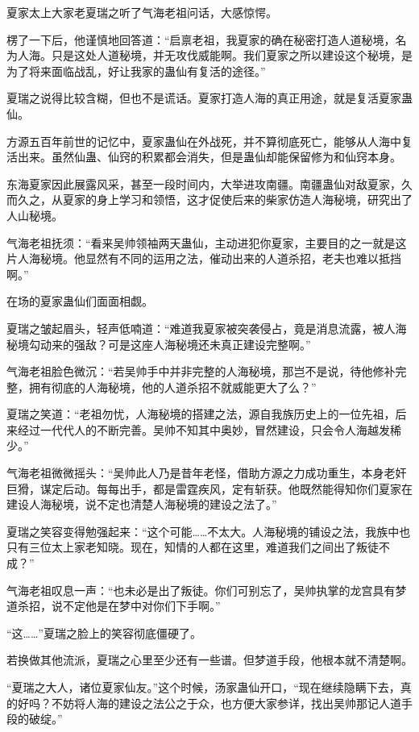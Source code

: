 
\begin{this_body}

夏家太上大家老夏瑞之听了气海老祖问话，大感惊愕。

楞了一下后，他谨慎地回答道：“启禀老祖，我夏家的确在秘密打造人道秘境，名为人海。只是这处人道秘境，并无攻伐威能啊。我们夏家之所以建设这个秘境，是为了将来面临战乱，好让我家的蛊仙有复活的途径。”

夏瑞之说得比较含糊，但也不是谎话。夏家打造人海的真正用途，就是复活夏家蛊仙。

方源五百年前世的记忆中，夏家蛊仙在外战死，并不算彻底死亡，能够从人海中复活出来。虽然仙蛊、仙窍的积累都会消失，但是蛊仙却能保留修为和仙窍本身。

东海夏家因此展露风采，甚至一段时间内，大举进攻南疆。南疆蛊仙对敌夏家，久而久之，从夏家的身上学习和领悟，这才促使后来的柴家仿造人海秘境，研究出了人山秘境。

气海老祖抚须：“看来吴帅领袖两天蛊仙，主动进犯你夏家，主要目的之一就是这片人海秘境。他显然有不同的运用之法，催动出来的人道杀招，老夫也难以抵挡啊。”

在场的夏家蛊仙们面面相觑。

夏瑞之皱起眉头，轻声低喃道：“难道我夏家被突袭侵占，竟是消息流露，被人海秘境勾动来的强敌？可是这座人海秘境还未真正建设完整啊。”

气海老祖脸色微沉：“若吴帅手中并非完整的人海秘境，那岂不是说，待他修补完整，拥有彻底的人海秘境，他的人道杀招不就威能更大了么？”

夏瑞之笑道：“老祖勿忧，人海秘境的搭建之法，源自我族历史上的一位先祖，后来经过一代代人的不断完善。吴帅不知其中奥妙，冒然建设，只会令人海越发稀少。”

气海老祖微微摇头：“吴帅此人乃是昔年老怪，借助方源之力成功重生，本身老奸巨猾，谋定后动。每每出手，都是雷霆疾风，定有斩获。他既然能得知你们夏家在建设人海秘境，说不定也清楚人海秘境的建设之法了。”

夏瑞之笑容变得勉强起来：“这个可能……不太大。人海秘境的铺设之法，我族中也只有三位太上家老知晓。现在，知情的人都在这里，难道我们之间出了叛徒不成？”

气海老祖叹息一声：“也未必是出了叛徒。你们可别忘了，吴帅执掌的龙宫具有梦道杀招，说不定他是在梦中对你们下手啊。”

“这……”夏瑞之脸上的笑容彻底僵硬了。

若换做其他流派，夏瑞之心里至少还有一些谱。但梦道手段，他根本就不清楚啊。

“夏瑞之大人，诸位夏家仙友。”这个时候，汤家蛊仙开口，“现在继续隐瞒下去，真的好吗？不妨将人海的建设之法公之于众，也方便大家参详，找出吴帅那记人道手段的破绽。”


\end{this_body}
